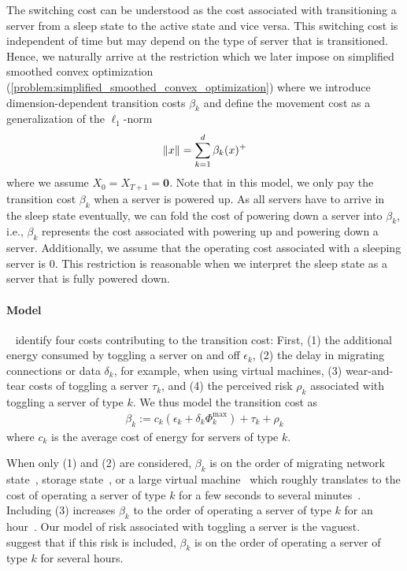 The switching cost can be understood as the cost associated with transitioning a server from a sleep state to the active state and vice versa. This switching cost is independent of time but may depend on the type of server that is transitioned. Hence, we naturally arrive at the restriction which we later impose on simplified smoothed convex optimization (\cref{problem:simplified_smoothed_convex_optimization}) where we introduce dimension-dependent transition costs $\beta_k$ and define the movement cost as a generalization of the $\ell_1$-norm \begin{align*}
    \lVert x\rVert = \sum_{k=1}^d \beta_k (x)^+
\end{align*} where we assume $X_0 = X_{T+1} = \mathbf{0}$. Note that in this model, we only pay the transition cost $\beta_k$ when a server is powered up. As all servers have to arrive in the sleep state eventually, we can fold the cost of powering down a server into $\beta_k$, i.e., $\beta_k$ represents the cost associated with powering up and powering down a server. Additionally, we assume that the operating cost associated with a sleeping server is $0$. This restriction is reasonable when we interpret the sleep state as a server that is fully powered down.

\paragraph{Model} \citeauthor{Lin2011}~\cite{Lin2011} identify four costs contributing to the transition cost: First, (1) the additional energy consumed by toggling a server on and off $\epsilon_k$, (2) the delay in migrating connections or data $\delta_k$, for example, when using virtual machines, (3) wear-and-tear costs of toggling a server $\tau_k$, and (4) the perceived risk $\rho_k$ associated with toggling a server of type $k$. We thus model the transition cost as \begin{align*}
    \beta_k := c_k(\epsilon_k + \delta_k \Phi_k^{\text{max}}) + \tau_k + \rho_k
\end{align*} where $c_k$ is the average cost of energy for servers of type $k$.

When only (1) and (2) are considered, $\beta_k$ is on the order of migrating network state~\cite{Chen2008}, storage state~\cite{Thereska2009}, or a large virtual machine~\cite{Clark2005} which roughly translates to the cost of operating a server of type $k$ for a few seconds to several minutes~\cite{Lin2011}. Including (3) increases $\beta_k$ to the order of operating a server of type $k$ for an hour~\cite{Bodik2008}. Our model of risk associated with toggling a server is the vaguest. \citeauthor{Lin2011}~\cite{Lin2011} suggest that if this risk is included, $\beta_k$ is on the order of operating a server of type $k$ for several hours.

